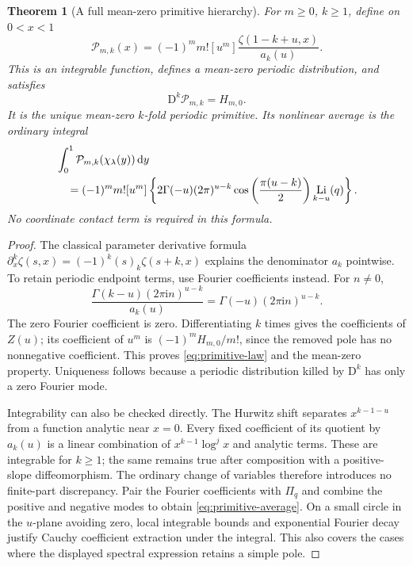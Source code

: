 \documentclass[11pt]{article}
\newtheorem{theorem}{Theorem}[section]
\theoremstyle{definition}\newtheorem{definition}[theorem]{Definition}
\theoremstyle{remark}\newtheorem{remark}[theorem]{Remark}
\DeclareMathOperator{\Li}{Li}
\newcommand{\dd}{\,\mathrm d}
\newcommand{\ii}{\mathrm i}
\newcommand{\D}{\mathrm D}
\newcommand{\Pc}{\mathcal P}
\begin{document}
\begin{theorem}[A full mean-zero primitive hierarchy]\label{thm:primitive}
For $m\ge0$, $k\ge1$, define on $0<x<1$
\begin{equation}\label{eq:primitive-family}
\Pc_{m,k}(x)=(-1)^mm![u^m]
\frac{\zeta(1-k+u,x)}{a_k(u)}.
\end{equation}
This is an integrable function, defines a mean-zero periodic distribution, and satisfies
\begin{equation}\label{eq:primitive-law}
\D^k\Pc_{m,k}=H_{m,0}.
\end{equation}
It is the unique mean-zero $k$-fold periodic primitive. Its nonlinear average is the ordinary integral
\begin{align}\label{eq:primitive-average}
&\int_0^1\Pc_{m,k}(\chi_\lambda(y))\dd y\\
&\quad=(-1)^mm![u^m]
\left\{2\Gamma(-u)(2\pi)^{u-k}
\cos\left(\frac{\pi(u-k)}2\right)\Li_{k-u}(q)\right\}.\notag
\end{align}
No coordinate contact term is required in this formula.
\end{theorem}
\begin{proof}
The classical parameter derivative formula
$\partial_x^k\zeta(s,x)=(-1)^k(s)_k\zeta(s+k,x)$
explains the denominator $a_k$ pointwise. To retain periodic endpoint terms, use Fourier coefficients instead. For $n\ne0$,
\[
\frac{\Gamma(k-u)(2\pi\ii n)^{u-k}}{a_k(u)}
=\Gamma(-u)(2\pi\ii n)^{u-k}.
\]
The zero Fourier coefficient is zero. Differentiating $k$ times gives the coefficients of $Z(u)$; its coefficient of $u^m$ is $(-1)^mH_{m,0}/m!$, since the removed pole has no nonnegative coefficient. This proves \eqref{eq:primitive-law} and the mean-zero property. Uniqueness follows because a periodic distribution killed by $\D^k$ has only a zero Fourier mode.

Integrability can also be checked directly. The Hurwitz shift separates $x^{k-1-u}$ from a function analytic near $x=0$. Every fixed coefficient of its quotient by $a_k(u)$ is a linear combination of $x^{k-1}\log^j x$ and analytic terms. These are integrable for $k\ge1$; the same remains true after composition with a positive-slope diffeomorphism. The ordinary change of variables therefore introduces no finite-part discrepancy. Pair the Fourier coefficients with $\Pi_q$ and combine the positive and negative modes to obtain \eqref{eq:primitive-average}. On a small circle in the $u$-plane avoiding zero, local integrable bounds and exponential Fourier decay justify Cauchy coefficient extraction under the integral. This also covers the cases where the displayed spectral expression retains a simple pole.
\end{proof}
\end{document}
